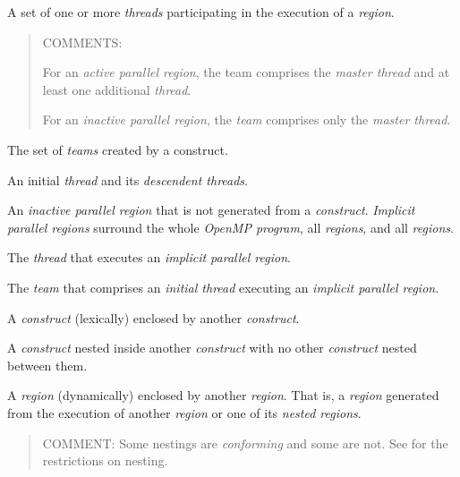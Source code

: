 \glossarydefstart
A set of one or more \emph{threads} participating in the execution 
of a 
\emph{region}.

\begin{quote}
COMMENTS:

For an \emph{active parallel region}, the team comprises the 
\emph{master thread} and at least one additional \emph{thread}.

For an \emph{inactive parallel region}, the \emph{team} comprises 
only the \emph{master thread}.
\end{quote}
\glossarydefend

\glossarydefstart
The set of \emph{teams} created by a  construct.
\glossarydefend

\glossarydefstart
An initial \emph{thread} and its \emph{descendent threads}.
\glossarydefend

\glossarydefstart
An \emph{inactive parallel region} that is not generated from a
 \emph{construct}. \emph{Implicit parallel regions} 
surround the whole \emph{OpenMP program}, all  
\emph{regions}, and all  \emph{regions}.

\glossarydefend

\glossarydefstart
The \emph{thread} that executes an \emph{implicit parallel region}.
\glossarydefend

\glossarydefstart
The \emph{team} that comprises an \emph{initial thread} executing 
an \emph{implicit parallel region}.
\glossarydefend

\glossarydefstart
A \emph{construct} (lexically) enclosed by another \emph{construct}.
\glossarydefend

\glossarydefstart
A \emph{construct} nested inside another \emph{construct} with no 
other \emph{construct} nested between them.
\glossarydefend

\glossarydefstart
A \emph{region} (dynamically) enclosed by another \emph{region}.  That is, a
\emph{region} generated from the execution of another \emph{region}
or one of its \emph{nested regions}.

\begin{quote}
COMMENT: Some nestings are \emph{conforming} and some are not.
See  for the restrictions on nesting.
\end{quote}
\glossarydefend

